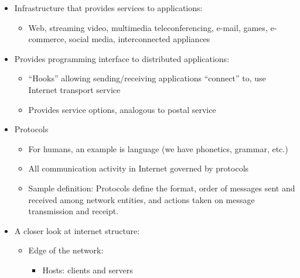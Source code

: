 \begin{itemize}
  \item Infrastructure that provides services to applications:

    \begin{itemize}

      \item Web, streaming video, multimedia teleconferencing, e-mail, games, e-commerce, social media, interconnected appliances

    \end{itemize}
    
  \item Provides programming interface to distributed applications:

    \begin{itemize}

      \item ``Hooks'' allowing sending/receiving applications ``connect'' to, use Internet transport service

      \item Provides service options, analogous to postal service

    \end{itemize}

  \item Protocols

    \begin{itemize}

      \item For humans, an example is language (we have phonetics, grammar, etc.)

      \item All communication activity in Internet governed by protocols

      \item Sample definition: Protocols define the format, order of messages sent and received among network entities, and actions taken on message transmission and receipt.

    \end{itemize}

  \item A closer look at internet structure:

    \begin{itemize}

      \item Edge of the network:

        \begin{itemize}

          \item Hosts: clients and servers


\end{itemize}
\end{itemize}
\end{itemize}
